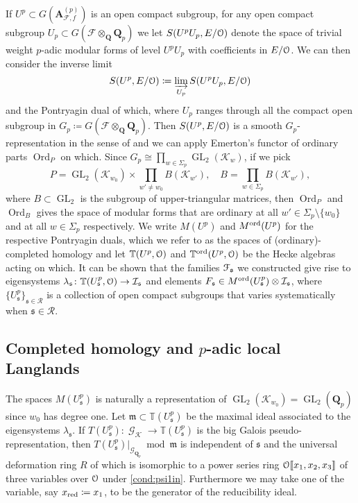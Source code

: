 \documentclass[leqno]{amsart}
\theoremstyle{definition}
\theoremstyle{remark}
\newcommand{\eo}{\EuScript{O}}
\newcommand{\Q}{{\mathbf{Q}}}
\newcommand{\Qp}{\mathbf{Q}_p}
\newcommand{\A}{\mathbf A}
\DeclareMathOperator{\GL}{GL}
\DeclareMathOperator{\Gal}{\mathcal{G}}
\newcommand{\fm}{\mathfrak{m}}
\newcommand{\fs}{\mathfrak{s}}
\DeclareMathOperator{\Ord}{Ord} %
\newcommand{\Gp}{\mathcal{G}_{\Qp}} %
\newcommand{\xx}{x_\textnormal{red}}
\newcommand{\F}{{\mathcal{F}}} %
\newcommand{\K}{{\mathcal{K}}} %
\newcommand{\TT}{\mathbb{T}} %
\newcommand{\euF}{\EuScript{F}} %
\newcommand{\I}{\mathcal{I}} %
\newcommand{\ord}{\textnormal{ord}} %
\begin{document}
If $U^p\subset G(\A_{\F,f}^{(p)})$ is an open compact subgroup,
for any open compact subgroup $U_p\subset G(\F\otimes_\Q\Qp)$
we let $S(U^pU_p,E/\eo)$ denote the space
of trivial weight $p$-adic modular forms 
of level $U^pU_p$ with coefficients in $E/\eo$.
We can then consider the inverse limit
\[
    S(U^p,E/\eo)\coloneqq \varinjlim_{U_p}
    S(U^pU_p, E/\eo)
\]
and the Pontryagin dual of which,
where $U_p$ ranges through all the compact open subgroup
in $G_p\coloneqq G(\F\otimes_\Q\Qp)$.
Then $S(U^p,E/\eo)$ is a smooth $G_p$-representation
in the sense of \cite{emeI} and we can apply
Emerton's functor of ordinary parts $\Ord_P$ on which.
Since $G_p\cong \prod_{w\in\Sigma_p}\GL_2(\K_w)$,
if we pick 
\[
    P=\GL_2(\K_{w_0})\times\prod_{w'\neq w_0}B(\K_{w'}),\quad
    B=\prod_{w\in \Sigma_p}B(\K_{w'}),
\]
where $B\subset \GL_2$ is the subgroup of upper-triangular matrices,
then $\Ord_P$ and $\Ord_B$
gives the space of modular forms 
that are ordinary at all $w'\in \Sigma_p\setminus\{w_0\}$ 
and at all $w\in \Sigma_p$ respectively.
We write $M(U^p)$ and $M^{\ord}(U^p)$
for the respective Pontryagin duals,
which we refer to as the spaces of (ordinary)-completed homology
and let $\TT(U^p,\eo)$ and $\TT^{\ord}(U^p,\eo)$
be the Hecke algebras acting on which. 
It can be shown that the families $\euF_\fs$
we constructed give rise to eigensystems
$\lambda_\fs\colon \TT(U^p_\fs,\eo)\to \I_\fs$
and elements $F_\fs\in M^{\ord}(U^p_\fs)\otimes \I_\fs$,
where $\{U^p_\fs\}_{\fs\in\mathcal{R}}$
is a collection of open compact subgroups
that varies systematically when $\fs\in\mathcal{R}$.

\subsection*{Completed homology and $p$-adic local Langlands}

The spaces $M(U^p_\fs)$ is naturally 
a representation of $\GL_2(\K_{w_0})=\GL_2(\Qp)$
since $w_0$ has degree one.
Let $\fm\subset \TT(U^p_\fs)$ be the maximal ideal
associated to the eigensystems $\lambda_\fs$.
If $T(U^p_\fs)\colon \Gal_\K\to \TT(U^p_\fs)$
is the big Galois pseudo-representation,
then $T(U^p_\fs)\vert_{\Gp}\bmod \fm$
is independent of $\fs$ 
and the universal deformation ring $R$ of which
is isomorphic to a power series ring
$\eo\llbracket x_1,x_2,x_3\rrbracket$ of three variables over $\eo$
under \ref{cond:psi1in}.
Furthermore we may take one of the variable, say $\xx\coloneqq x_1$,
to be the generator of the reducibility ideal.
\end{document}
